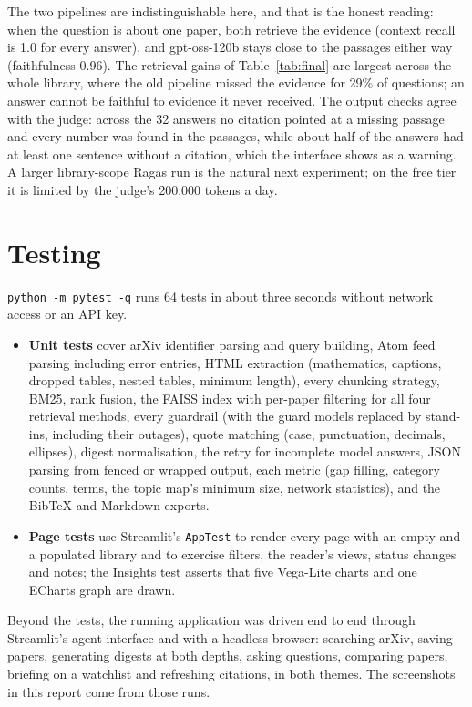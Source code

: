 \documentclass[11pt,a4paper]{article}
\newcommand{\code}[1]{\texttt{#1}}
\begin{document}
The two pipelines are indistinguishable here, and that is the honest reading: when the question is about
one paper, both retrieve the evidence (context recall is 1.0 for every answer), and gpt-oss-120b stays close
to the passages either way (faithfulness 0.96). The retrieval gains of Table~\ref{tab:final} are largest
across the whole library, where the old pipeline missed the evidence for 29\% of questions; an answer cannot
be faithful to evidence it never received. The output checks agree with the judge: across the 32 answers no
citation pointed at a missing passage and every number was found in the passages, while about half of the
answers had at least one sentence without a citation, which the interface shows as a warning. A larger
library-scope Ragas run is the natural next experiment; on the free tier it is limited by the judge's
200,000 tokens a day.


\section{Testing}

\code{python -m pytest -q} runs 64 tests in about three seconds without network access or an API key.
\begin{itemize}
\item \textbf{Unit tests} cover arXiv identifier parsing and query building, Atom feed parsing including
  error entries, HTML extraction (mathematics, captions, dropped tables, nested tables, minimum length),
  every chunking strategy, BM25, rank fusion, the FAISS index with per-paper filtering for all four retrieval
  methods, every guardrail (with the guard models replaced by stand-ins, including their outages), quote matching (case, punctuation, decimals, ellipses), digest normalisation, the retry for
  incomplete model answers, JSON parsing from fenced or wrapped output, each metric (gap filling, category
  counts, terms, the topic map's minimum size, network statistics), and the BibTeX and Markdown exports.
\item \textbf{Page tests} use Streamlit's \code{AppTest} to render every page with an empty and a populated
  library and to exercise filters, the reader's views, status changes and notes; the Insights test asserts
  that five Vega-Lite charts and one ECharts graph are drawn.
\end{itemize}
Beyond the tests, the running application was driven end to end through Streamlit's agent interface and
with a headless browser: searching arXiv, saving papers, generating digests at both depths, asking
questions, comparing papers, briefing on a watchlist and refreshing citations, in both themes. The
screenshots in this report come from those runs.
\end{document}

